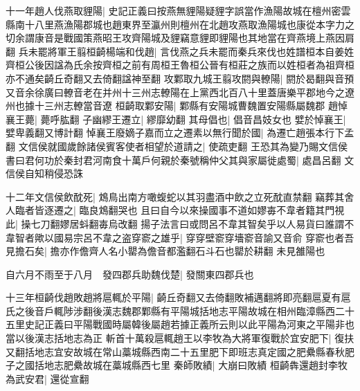十一年趙人伐燕取貍陽|{
	史記正義曰按燕無貍陽疑貍字誤當作漁陽故城在檀州密雲縣南十八里燕漁陽郡城也趙東界至瀛州則檀州在北趙攻燕取漁陽城也康從本字力之切余謂康音是戰國策燕昭王攻齊陽城及貍竊意貍即貍陽也其地當在齊燕境上燕因肩翻}
兵未罷將軍王翦桓齮楊端和伐趙|{
	言伐燕之兵未罷而秦兵來伐也姓譜桓本自姜姓齊桓公後因諡為氏余按齊桓之前有周桓王魯桓公晉有桓莊之族而以姓桓者為祖齊桓亦不通矣齮丘奇翻又去倚翻諡神至翻}
攻鄴取九城王翦攻閼與轑陽|{
	閼於曷翻與音預又音余徐廣曰轑音老在并州十三州志轑陽在上黨西北百八十里蓋唐樂平郡地今之遼州也據十三州志轑當音遼}
桓齮取鄴安陽|{
	鄴縣有安陽城曹魏置安陽縣屬魏郡}
趙悼襄王薨|{
	薨呼肱翻}
子幽繆王遷立|{
	繆靡幼翻}
其母倡也|{
	倡音昌妓女也}
嬖於悼襄王|{
	嬖卑義翻又博計翻}
悼襄王廢嫡子嘉而立之遷素以無行聞於國|{
	為遷亡趙張本行下孟翻}
文信侯就國歲餘諸侯賓客使者相望於道請之|{
	使疏吏翻}
王恐其為變乃賜文信侯書曰君何功於秦封君河南食十萬戶何親於秦號稱仲父其與家屬徙處蜀|{
	處昌呂翻}
文信侯自知稍侵恐誅

十二年文信侯飲酖死|{
	鴆鳥出南方噉蝮蛇以其羽盡酒中飲之立死酖直禁翻}
竊葬其舍人臨者皆逐遷之|{
	臨良鴆翻哭也}
且曰自今以來操國事不道如嫪毐不韋者籍其門視此|{
	操七刀翻嫪居蚪翻毐烏改翻}
揚子法言曰或問呂不韋其智矣乎以人易貨曰誰謂不韋智者歟以國易宗呂不韋之盗穿窬之雄乎|{
	穿穿壁窬穿墻窬音諭又音俞}
穿窬也者吾見擔石矣|{
	擔亦作儋齊人名小罌為儋音都濫翻石斗石也罌於耕翻}
未見雒陽也

自六月不雨至于八月　發四郡兵助魏伐楚|{
	發關東四郡兵也}


十三年桓齮伐趙敗趙將扈輒於平陽|{
	齮丘奇翻又去倚翻敗補邁翻將即亮翻扈夏有扈氏之後音戶輒陟涉翻後漢志魏郡鄴縣有平陽城括地志平陽故城在相州臨漳縣西二十五里史記正義曰平陽戰國時屬韓後屬趙若據正義所云則以此平陽為河東之平陽非也當以後漢志括地志為正}
斬首十萬殺扈輒趙王以李牧為大將軍復戰於宜安肥下|{
	復扶又翻括地志宜安故城在常山藁城縣西南二十五里肥下即班志真定國之肥纍縣春秋肥子之國括地志肥纍故城在藁城縣西七里}
秦師敗績|{
	大崩曰敗績}
桓齮犇還趙封李牧為武安君|{
	還從宣翻}


